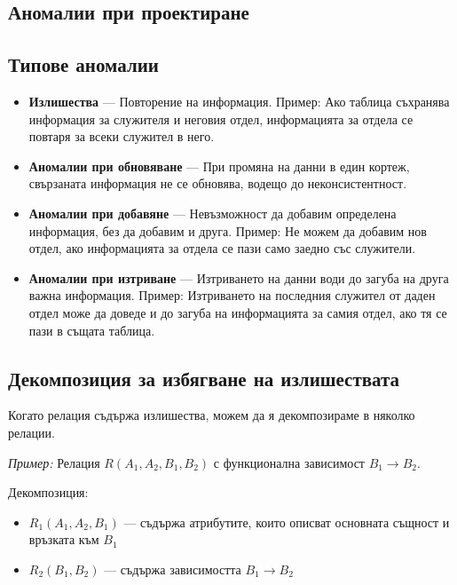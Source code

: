 \documentclass{scrartcl}
\begin{document}
\begin{FlushLeft}
\section{Аномалии при проектиране}

\subsection{Типове аномалии}

\begin{itemize}
    \item \textbf{Излишества} --- Повторение на информация. Пример: Ако таблица съхранява информация за служителя и неговия отдел, информацията за отдела се повтаря за всеки служител в него.
    
    \item \textbf{Аномалии при обновяване} --- При промяна на данни в един кортеж, свързаната информация не се обновява, водещо до неконсистентност.
    
    \item \textbf{Аномалии при добавяне} --- Невъзможност да добавим определена информация, без да добавим и друга. Пример: Не можем да добавим нов отдел, ако информацията за отдела се пази само заедно със служители.
    
    \item \textbf{Аномалии при изтриване} --- Изтриването на данни води до загуба на друга важна информация. Пример: Изтриването на последния служител от даден отдел може да доведе и до загуба на информацията за самия отдел, ако тя се пази в същата таблица.
\end{itemize}

\subsection{Декомпозиция за избягване на излишествата}

Когато релация съдържа излишества, можем да я декомпозираме в няколко релации.

\textit{Пример:} Релация $R(A_1, A_2, B_1, B_2)$ с функционална зависимост $B_1 \rightarrow B_2$.

Декомпозиция:
\begin{itemize}
    \item $R_1(A_1, A_2, B_1)$ --- съдържа атрибутите, които описват основната същност и връзката към $B_1$
    \item $R_2(B_1, B_2)$ --- съдържа зависимостта $B_1 \rightarrow B_2$
\end{itemize}


\end{FlushLeft}
\end{document}
